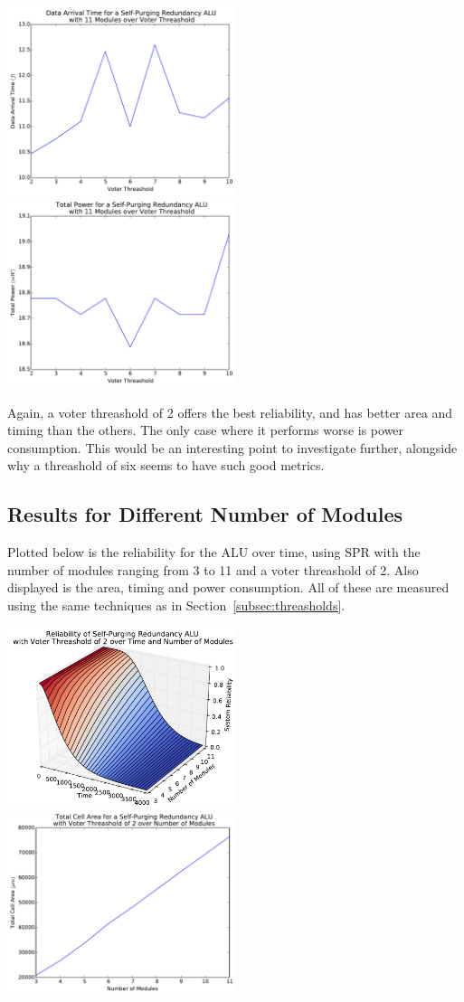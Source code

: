 \documentclass[a4paper,12pt]{article}
\begin{document}
    \includegraphics[width=0.5\textwidth]{time_11}
    \includegraphics[width=0.5\textwidth]{power_11}

    Again, a voter threashold of 2 offers the best reliability, and has better area and timing than the others. The only case where it performs worse is power consumption. This would be an interesting point to investigate further, alongside why a threashold of six seems to have such good metrics.

    \subsection{Results for Different Number of Modules}

    Plotted below is the reliability for the ALU over time, using SPR with the number of modules ranging from 3 to 11 and a voter threashold of 2. Also displayed is the area, timing and power consumption. All of these are measured using the same techniques as in Section~\ref{subsec:threasholds}.

    \includegraphics[width=0.5\textwidth]{reliability}
    \includegraphics[width=0.5\textwidth]{area}
\end{document}

